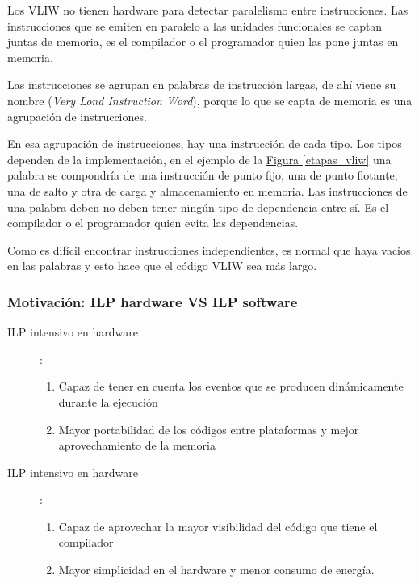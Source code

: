 \documentclass[10pt,a4paper,spanish]{report}
\begin{document}
Los VLIW no tienen hardware para detectar paralelismo entre instrucciones. Las instrucciones que se emiten en paralelo a las unidades funcionales se captan juntas de memoria, es el compilador o el programador quien las pone juntas en memoria.

Las instrucciones se agrupan en palabras de instrucción largas, de ahí viene su nombre (\textit{\textcolor{azul}{Very Lond Instruction Word}}), porque lo que se capta de memoria es una agrupación de instrucciones.

En esa agrupación de instrucciones, hay una instrucción de cada tipo. Los tipos dependen de la implementación, en el ejemplo de la \hyperref[etapas_vliw]{Figura \ref*{etapas_vliw}} una palabra se compondría de una instrucción de punto fijo, una de punto flotante, una de salto y otra de carga y almacenamiento en memoria. Las instrucciones de una palabra deben no deben tener ningún tipo de dependencia entre sí. Es el compilador o el programador quien evita las dependencias.

Como es difícil encontrar instrucciones independientes, es normal que haya vacios en las palabras y esto hace que el código VLIW sea más largo.

\textcolor{azul}{\subsubsection{Motivación: ILP hardware VS ILP software}}
\begin{description}
    \item[ILP intensivo en hardware]:
    \begin{enumerate}[\color{azul}{$\heartsuit$}]
        \item Capaz de tener en cuenta los eventos que se producen dinámicamente durante la ejecución
        \item Mayor portabilidad de los códigos entre plataformas y mejor aprovechamiento de la memoria
    \end{enumerate}
    \item[ILP intensivo en hardware]:
    \begin{enumerate}[\color{azul}{$\heartsuit$}]
        \item Capaz de aprovechar la mayor visibilidad del código que tiene el compilador
        \item Mayor simplicidad en el hardware y menor consumo de energía.
    \end{enumerate}
\end{description}
\end{document}
